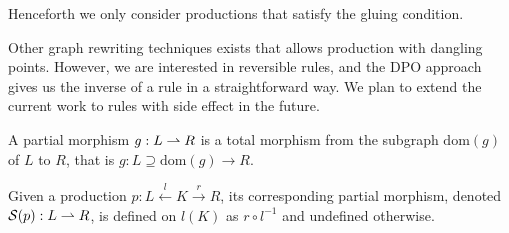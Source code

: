Henceforth we only consider productions that satisfy the gluing condition.

\begin{remark}
Other graph rewriting techniques exists that allows production with dangling points. However, we are interested in reversible rules, and the DPO approach gives us the inverse of a rule in a straightforward way. We plan to extend the current work to rules with side effect in the future.
\end{remark}

\begin{definition}
  A partial morphism $g:L \rightharpoonup R$ is a total morphism from the subgraph $\text{dom}(g)$ of $L$ to $R$, that is $g:L \supseteq \text{dom}(g) \to R$.
\end{definition}

\begin{definition}
  Given a production $p:L\overset{l}{\leftarrow} K \overset{r}{\rightarrow} R$, its corresponding partial morphism, denoted $\mathcal{S}(p):L\rightharpoonup R$, is defined on $l(K)$ as $r\circ l^{-1}$ and undefined otherwise.
\end{definition}
